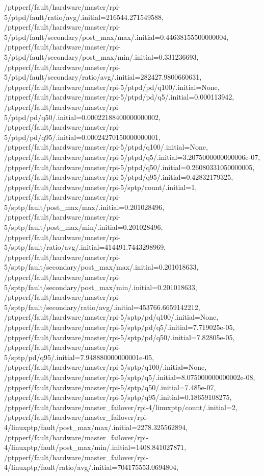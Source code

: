 {    /ptpperf/fault/hardware/master/rpi-5/ptpd/fault/ratio/avg/.initial=216544.271549588,
    /ptpperf/fault/hardware/master/rpi-5/ptpd/fault/secondary/post_max/max/.initial=0.44638155500000004,
    /ptpperf/fault/hardware/master/rpi-5/ptpd/fault/secondary/post_max/min/.initial=0.331236693,
    /ptpperf/fault/hardware/master/rpi-5/ptpd/fault/secondary/ratio/avg/.initial=282427.9800660631,
    /ptpperf/fault/hardware/master/rpi-5/ptpd/pd/q100/.initial=None,
    /ptpperf/fault/hardware/master/rpi-5/ptpd/pd/q5/.initial=0.000113942,
    /ptpperf/fault/hardware/master/rpi-5/ptpd/pd/q50/.initial=0.00022188400000000002,
    /ptpperf/fault/hardware/master/rpi-5/ptpd/pd/q95/.initial=0.00024270150000000001,
    /ptpperf/fault/hardware/master/rpi-5/ptpd/q100/.initial=None,
    /ptpperf/fault/hardware/master/rpi-5/ptpd/q5/.initial=3.2075000000000006e-07,
    /ptpperf/fault/hardware/master/rpi-5/ptpd/q50/.initial=0.26080331050000005,
    /ptpperf/fault/hardware/master/rpi-5/ptpd/q95/.initial=0.42832179325,
    /ptpperf/fault/hardware/master/rpi-5/sptp/count/.initial=1,
    /ptpperf/fault/hardware/master/rpi-5/sptp/fault/post_max/max/.initial=0.201028496,
    /ptpperf/fault/hardware/master/rpi-5/sptp/fault/post_max/min/.initial=0.201028496,
    /ptpperf/fault/hardware/master/rpi-5/sptp/fault/ratio/avg/.initial=414491.7443298969,
    /ptpperf/fault/hardware/master/rpi-5/sptp/fault/secondary/post_max/max/.initial=0.201018633,
    /ptpperf/fault/hardware/master/rpi-5/sptp/fault/secondary/post_max/min/.initial=0.201018633,
    /ptpperf/fault/hardware/master/rpi-5/sptp/fault/secondary/ratio/avg/.initial=453766.6659142212,
    /ptpperf/fault/hardware/master/rpi-5/sptp/pd/q100/.initial=None,
    /ptpperf/fault/hardware/master/rpi-5/sptp/pd/q5/.initial=7.719025e-05,
    /ptpperf/fault/hardware/master/rpi-5/sptp/pd/q50/.initial=7.82805e-05,
    /ptpperf/fault/hardware/master/rpi-5/sptp/pd/q95/.initial=7.948880000000001e-05,
    /ptpperf/fault/hardware/master/rpi-5/sptp/q100/.initial=None,
    /ptpperf/fault/hardware/master/rpi-5/sptp/q5/.initial=8.075000000000002e-08,
    /ptpperf/fault/hardware/master/rpi-5/sptp/q50/.initial=7.485e-07,
    /ptpperf/fault/hardware/master/rpi-5/sptp/q95/.initial=0.18659108275,
    /ptpperf/fault/hardware/master_failover/rpi-4/linuxptp/count/.initial=2,
    /ptpperf/fault/hardware/master_failover/rpi-4/linuxptp/fault/post_max/max/.initial=2278.325562894,
    /ptpperf/fault/hardware/master_failover/rpi-4/linuxptp/fault/post_max/min/.initial=1408.841027871,
    /ptpperf/fault/hardware/master_failover/rpi-4/linuxptp/fault/ratio/avg/.initial=704175553.0694804,
}
